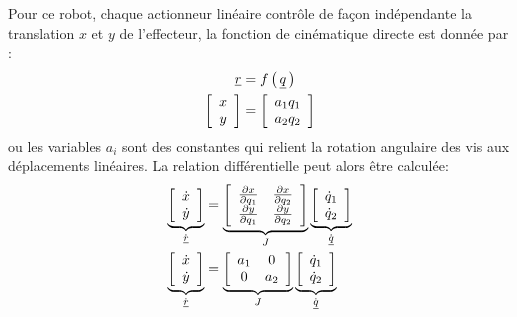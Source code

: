 Pour ce robot, chaque actionneur linéaire contrôle de façon indépendante la translation $x$ et $y$ de l'effecteur, la fonction de cinématique directe est donnée par :
\begin{align}
\quad \underline{r} &= f\left( \, \underline{q} \, \right)  \\
\left[ \begin{array}{c} x \\ y  \end{array} \right]  &= \left[ \begin{array}{c} a_1 q_1 \\ a_2 q_2  \end{array} \right]
\label{eq:fwdkinlin}
\end{align}
ou les variables $a_i$ sont des constantes qui relient la rotation angulaire des vis aux déplacements linéaires. La relation différentielle peut alors être calculée:
\begin{align}
\underbrace{ \left[ \begin{array}{c} \dot{x} \\ \dot{y}  \end{array} \right] }_{\dot{\underline{r}}}
 &= 
\underbrace{ \left[ \begin{array}{c c } 
\frac{\partial x }{\partial q_1}   & \frac{\partial x }{\partial q_2} \\ 
\frac{\partial y }{\partial q_1}   & \frac{\partial y }{\partial q_2}
\end{array} \right]  }_{ J } 
\underbrace{ \left[ \begin{array}{c} 
\dot{q}_1 \\ 
\dot{q}_2 
\end{array} \right]}_{ \dot{\underline{q}} } \\
\underbrace{ \left[ \begin{array}{c} \dot{x} \\ \dot{y}  \end{array} \right] }_{\dot{\underline{r}}}
 &= 
\underbrace{ \left[ \begin{array}{c c } 
a_1 & 0 \\ 
0   & a_2
\end{array} \right]  }_{ J } 
\underbrace{ \left[ \begin{array}{c} 
\dot{q}_1 \\ 
\dot{q}_2 
\end{array} \right]}_{ \dot{\underline{q}} } \\
\end{align} 

